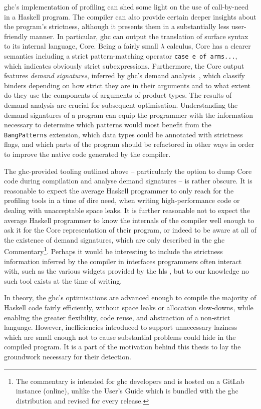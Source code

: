 \documentclass[thesis=B,english]{FITthesis}[2019/12/23]
\newcommand{\hsCode}[1]{\texttt{#1}}
\begin{document}
\acrshort{ghc}'s implementation of profiling can shed some light on the use of
call-by-need in a Haskell program. The compiler can also provide certain deeper
insights about the program's strictness, although it presents them in a
substantially less user-friendly manner. In particular, \acrshort{ghc} can
output the translation of surface syntax to its internal language, Core. Being
a fairly small $\lambda$ calculus, Core has a clearer semantics including a
strict pattern-matching operator \hsCode{case e of arms...}, which indicates
obviously strict subexpressions. Furthermore, the Core output features
\textit{demand signatures}, inferred by \acrshort{ghc}'s demand
analysis~\cite{cmtary-demand-analysis}, which classify binders depending on how
strict they are in their arguments and to what extent do they use the
components of arguments of product types. The results of demand analysis are
crucial for subsequent optimisation. Understanding the demand signatures of a
program can equip the programmer with the information necessary to determine
which patterns would most benefit from the \texttt{BangPatterns} extension,
which data types could be annotated with strictness flags, and which parts of
the program should be refactored in other ways in order to improve the native
code generated by the compiler.

The \acrshort{ghc}-provided tooling outlined above -- particularly the option
to dump Core code during compilation and analyse demand signatures -- is rather
obscure. It is reasonable to expect the average Haskell programmer to only
reach for the profiling tools in a time of dire need, when writing
high-performance code or dealing with unacceptable space leaks. It is further
reasonable not to expect the average Haskell programmer to know the internals
of the compiler well enough to ask it for the Core representation of their
program, or indeed to be aware at all of the existence of demand signatures,
which are only described in the \acrshort{ghc} Commentary\footnote{
	The commentary is intended for \acrshort{ghc} developers and is hosted on a
	GitLab instance (online), unlike the User's Guide which is bundled with the
	\acrshort{ghc} distribution and revised for every release.
}. Perhaps it would be interesting to include the strictness information
inferred by the compiler in interfaces programmers often interact with, such as
the various widgets provided by the \acrfull{hls} \cite{gh-hls}, but
to our knowledge no such tool exists at the time of writing.

In theory, the \acrlong{ghc}'s optimisations are advanced enough to compile the
majority of Haskell code fairly efficiently, without space leaks or allocation
slow-downs, while enabling the greater flexibility, code reuse, and abstraction
of a non-strict language. However, inefficiencies introduced to support
unnecessary laziness which are small enough not to cause substantial problems
could hide in the compiled program. It is a part of the motivation behind this
thesis to lay the groundwork necessary for their detection.
\end{document}
